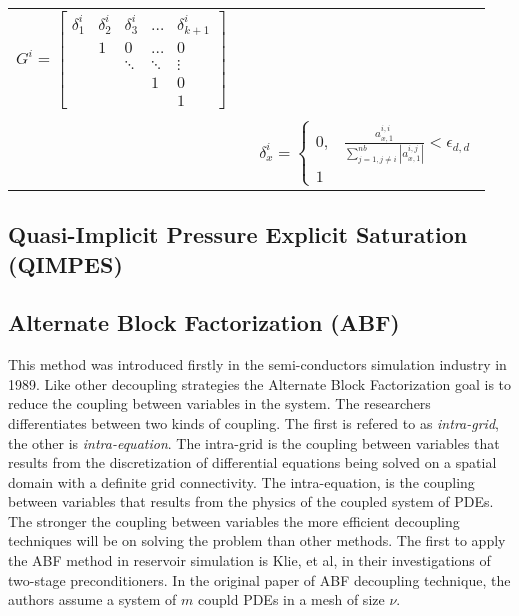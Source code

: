 \begin{table}[htb]
\begin{tabularx}{\linewidth}{c||l||c}
$G^{i} = \begin{bmatrix}
	\delta_{1}^{i} &\delta_{2}^{i}&\delta_{3}^{i}& \dots &\delta_{k+1}^{i} \\
 & 1 & 0 & \dots & 0 \\
 &  & \ddots & \ddots & \vdots \\
 &  &  & 1 & 0 \\
 &  &  &  & 1 
\end{bmatrix} $\\
	&&\\
	&&
$\delta_{x}^{i} = \begin{cases} 
0, & \frac{a_{x,1}^{i,i}}{\sum_{j=1,j\neq i}^{nb} |a_{x,1}^{i,j}|} < \epsilon_{d,d} \\  
1 & 
     \end{cases} $\\
    \bottomrule
\end{tabularx}
\end{table}

\subsection{Quasi-Implicit Pressure Explicit Saturation (QIMPES)}

\subsection{Alternate Block Factorization (ABF)}
This method was introduced firstly in the semi-conductors simulation industry in 1989\supercite{Bank1989}. Like other decoupling strategies the
Alternate Block Factorization goal is to reduce the coupling between variables in the system. The researchers differentiates between two kinds
of coupling. The first is refered to as \textit{intra-grid}, the other is \textit{intra-equation}. The intra-grid is the coupling between 
variables that results from the discretization of differential equations being solved on a spatial domain with a definite grid connectivity.
The intra-equation, is the coupling between variables that results from the physics of the coupled system of PDEs.
The stronger the coupling between variables the more efficient decoupling techniques will be on solving the problem than other methods.
The first to apply the ABF method in reservoir simulation is Klie, et al\supercite{klie}, in their investigations of two-stage preconditioners. 
In the original paper of ABF decoupling technique, the authors assume a system of $m$ coupld PDEs in a mesh of size $\nu$.

